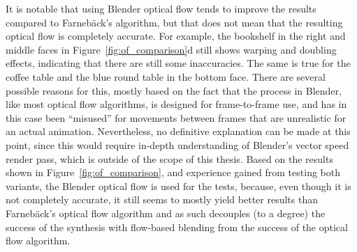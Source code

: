 
It is notable that using Blender optical flow tends to improve the results compared to Farneb\"ack's algorithm, but that does not mean that the resulting optical flow is completely accurate. For example, the bookshelf in the right and middle faces in Figure~\ref{fig:of_comparison}d still shows warping and doubling effects, indicating that there are still some inaccuracies. The same is true for the coffee table and the blue round table in the bottom face. There are several possible reasons for this, mostly based on the fact that the process in Blender, like most optical flow algorithms, is designed for frame-to-frame use, and has in this case been ``misused'' for movements between frames that are unrealistic for an actual animation. Nevertheless, no definitive explanation can be made at this point, since this would require in-depth understanding of Blender's vector speed render pass, which is outside of the scope of this thesis. Based on the results shown in Figure~\ref{fig:of_comparison}, and experience gained from testing both variants, the Blender optical flow is used for the tests, because, even though it is not completely accurate, it still seems to mostly yield better results than Farneb\"ack's optical flow algorithm and as such decouples (to a degree) the success of the synthesis with flow-based blending from the success of the optical flow algorithm.


